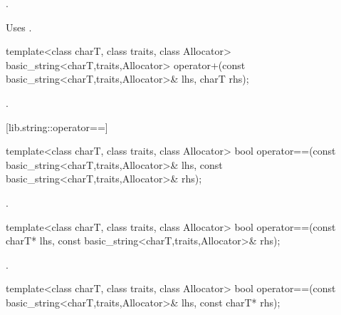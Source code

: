 \begin{itemdescr}
\pnum
\returns
{}.

\pnum
\notes
Uses
.
\end{itemdescr}

%
%
\begin{itemdecl}
template<class charT, class traits, class Allocator>
  basic_string<charT,traits,Allocator>
    operator+(const basic_string<charT,traits,Allocator>& lhs,
              charT rhs);
\end{itemdecl}

\begin{itemdescr}
\pnum
\returns
{}.
\end{itemdescr}

[lib.string::operator==]{}

%
%
\begin{itemdecl}
template<class charT, class traits, class Allocator>
  bool operator==(const basic_string<charT,traits,Allocator>& lhs,
                  const basic_string<charT,traits,Allocator>& rhs);
\end{itemdecl}

\begin{itemdescr}
\pnum
\returns
{}.
\end{itemdescr}

%
%
\begin{itemdecl}
template<class charT, class traits, class Allocator>
  bool operator==(const charT* lhs,
                  const basic_string<charT,traits,Allocator>& rhs);
\end{itemdecl}

\begin{itemdescr}
\pnum
\returns
{}.
\end{itemdescr}

%
%
\begin{itemdecl}
template<class charT, class traits, class Allocator>
  bool operator==(const basic_string<charT,traits,Allocator>& lhs,
                  const charT* rhs);
\end{itemdecl}

